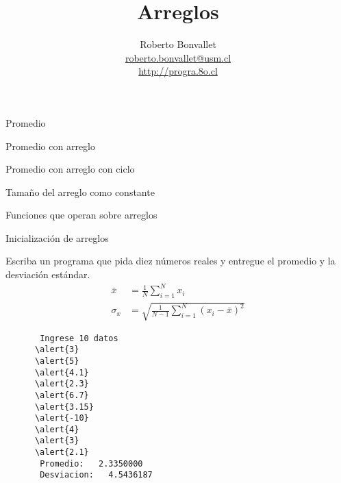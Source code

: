 \documentclass[10pt]{beamer}
\title{Arreglos}
\author{
  Roberto Bonvallet \\
  \url{roberto.bonvallet@usm.cl} \\
  \url{http://progra.8o.cl}
}
\begin{document}
  \begin{frame}
    \maketitle
  \end{frame}

  \begin{frame}{Promedio}
    
  \end{frame}

  \begin{frame}{Promedio con arreglo}
    
  \end{frame}

  \begin{frame}{Promedio con arreglo con ciclo}
    
  \end{frame}

  \begin{frame}{Tamaño del arreglo como constante}
    
  \end{frame}

  \begin{frame}{Funciones que operan sobre arreglos}
    
  \end{frame}

  \begin{frame}{Inicialización de arreglos}
    
  \end{frame}

  \begin{frame}[fragile]
    Escriba un programa que pida diez números reales
    y entregue el promedio y la desviación estándar.
    \begin{align}
      \bar x   &= \frac{1}{N} \sum_{i=1}^{N} x_i \\
      \sigma_x &= \sqrt{\frac{1}{N-1} \sum_{i=1}^{N} (x_i - \bar x)^2}
    \end{align}

    \begin{Verbatim}
       Ingrese 10 datos
      \alert{3}
      \alert{5}
      \alert{4.1}
      \alert{2.3}
      \alert{6.7}
      \alert{3.15}
      \alert{-10}
      \alert{4}
      \alert{3}
      \alert{2.1}
       Promedio:   2.3350000    
       Desviacion:   4.5436187
    \end{Verbatim}

\end{frame}
\end{document}
